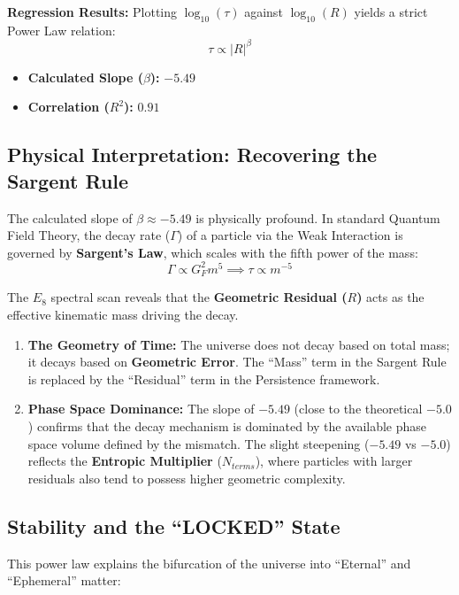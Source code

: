 \textbf{Regression Results:} Plotting $\log_{10}(\tau)$ against $\log_{10}(R)$ yields a strict Power Law relation: 
\[ \tau \propto |R|^{\beta} \]

\begin{itemize}
    \item \textbf{Calculated Slope ($\beta$):} \textbf{$-5.49$}
    \item \textbf{Correlation ($R^2$):} \textbf{$0.91$}
\end{itemize}

\subsection{Physical Interpretation: Recovering the Sargent Rule}

The calculated slope of $\beta \approx -5.49$ is physically profound. In standard Quantum Field Theory, the decay rate ($\Gamma$) of a particle via the Weak Interaction is governed by \textbf{Sargent's Law}, which scales with the fifth power of the mass: 
\[ \Gamma \propto G_F^2 m^5 \implies \tau \propto m^{-5} \]

The $E_8$ spectral scan reveals that the \textbf{Geometric Residual ($R$)} acts as the effective kinematic mass driving the decay.

\begin{enumerate}
    \item \textbf{The Geometry of Time:} The universe does not decay based on total mass; it decays based on \textbf{Geometric Error}. The ``Mass'' term in the Sargent Rule is replaced by the ``Residual'' term in the Persistence framework.
    \item \textbf{Phase Space Dominance:} The slope of $-5.49$ (close to the theoretical $-5.0$) confirms that the decay mechanism is dominated by the available phase space volume defined by the mismatch. The slight steepening ($-5.49$ vs $-5.0$) reflects the \textbf{Entropic Multiplier} ($N_{terms}$), where particles with larger residuals also tend to possess higher geometric complexity.
\end{enumerate}

\subsection{Stability and the ``LOCKED'' State}

This power law explains the bifurcation of the universe into ``Eternal'' and ``Ephemeral'' matter:

